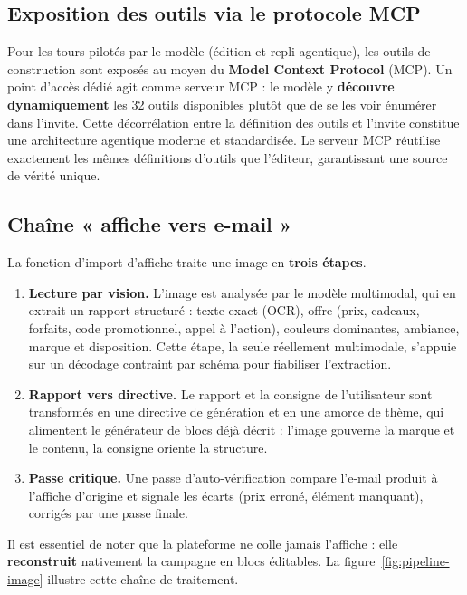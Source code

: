 
\subsection{Exposition des outils via le protocole MCP}
Pour les tours pilotés par le modèle (édition et repli agentique), les
outils de construction sont exposés au moyen du \textbf{Model Context
Protocol} (MCP). Un point d'accès dédié agit comme serveur MCP : le modèle y
\textbf{découvre dynamiquement} les 32 outils disponibles plutôt que de se
les voir énumérer dans l'invite. Cette décorrélation entre la définition des
outils et l'invite constitue une architecture agentique moderne et
standardisée. Le serveur MCP réutilise exactement les mêmes définitions
d'outils que l'éditeur, garantissant une source de vérité unique.

\subsection{Chaîne « affiche vers e-mail »}
La fonction d'import d'affiche traite une image en \textbf{trois étapes}.
\begin{enumerate}[leftmargin=1.4cm]
  \item \textbf{Lecture par vision.} L'image est analysée par le modèle
  multimodal, qui en extrait un rapport structuré : texte exact (OCR),
  offre (prix, cadeaux, forfaits, code promotionnel, appel à l'action),
  couleurs dominantes, ambiance, marque et disposition. Cette étape, la seule
  réellement multimodale, s'appuie sur un décodage contraint par schéma pour
  fiabiliser l'extraction.
  \item \textbf{Rapport vers directive.} Le rapport et la consigne de
  l'utilisateur sont transformés en une directive de génération et en une
  amorce de thème, qui alimentent le générateur de blocs déjà décrit :
  l'image gouverne la marque et le contenu, la consigne oriente la
  structure.
  \item \textbf{Passe critique.} Une passe d'auto-vérification compare
  l'e-mail produit à l'affiche d'origine et signale les écarts (prix erroné,
  élément manquant), corrigés par une passe finale.
\end{enumerate}
Il est essentiel de noter que la plateforme ne colle jamais l'affiche : elle
\textbf{reconstruit} nativement la campagne en blocs éditables. La
figure~\ref{fig:pipeline-image} illustre cette chaîne de traitement.


